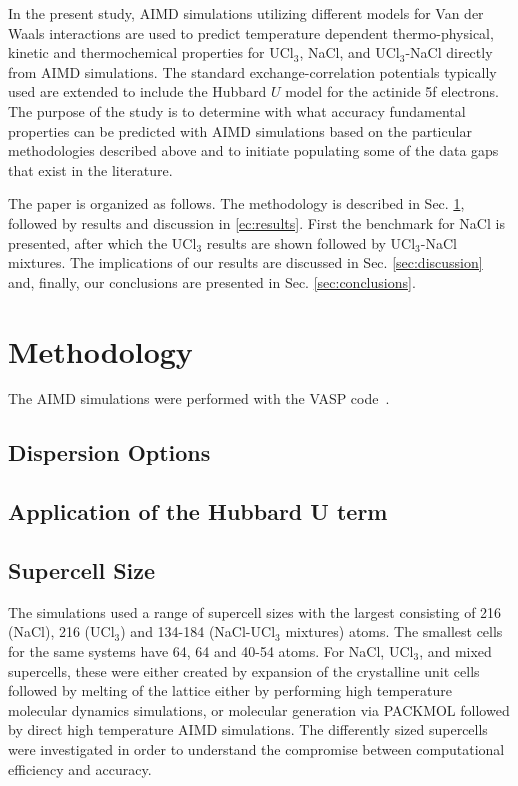 \documentclass[preprint,3p,10pt,twocolumn,number,sort&compress]{elsarticle}
\begin{document}
In the present study, AIMD simulations utilizing different models for Van der Waals interactions are used to predict temperature dependent thermo-physical, kinetic and thermochemical properties for UCl$_3$, NaCl, and UCl$_3$-NaCl directly from AIMD simulations. The standard exchange-correlation potentials typically used are extended to include the Hubbard $U$  model for the actinide 5f electrons. The purpose of the study is to determine with what accuracy fundamental properties can be predicted with AIMD simulations based on the particular methodologies described above and to initiate populating some of the data gaps that exist in the literature. 

The paper is organized as follows. The methodology is described in Sec. \ref{sec:method}, followed by results and discussion in \ref{ec:results}. First the benchmark for NaCl is presented, after which the UCl$_3$ results are shown followed by UCl$_3$-NaCl mixtures. The implications of our results are discussed in Sec. \ref{sec:discussion} and, finally, our conclusions are presented in Sec. \ref{sec:conclusions}. 

\section{Methodology}
\label{sec:method}
The AIMD simulations were performed with the VASP code~\cite{}. 

\subsection{Dispersion Options}

\subsection{Application of the Hubbard U term}

\subsection{Supercell Size}

The simulations used a range of supercell sizes with the largest consisting of 216 (NaCl), 216 (UCl$_3$) and 134-184 (NaCl-UCl$_3$ mixtures) atoms. The smallest cells for the same systems have 64, 64 and 40-54 atoms. For NaCl, UCl$_3$, and mixed supercells, these were either created by expansion of the crystalline unit cells followed by melting of the lattice either by performing high temperature molecular dynamics simulations, or molecular generation via PACKMOL \cite{packmol} followed by direct high temperature AIMD simulations. The differently sized supercells were investigated in order to understand the compromise between computational efficiency and accuracy. 
\end{document}
